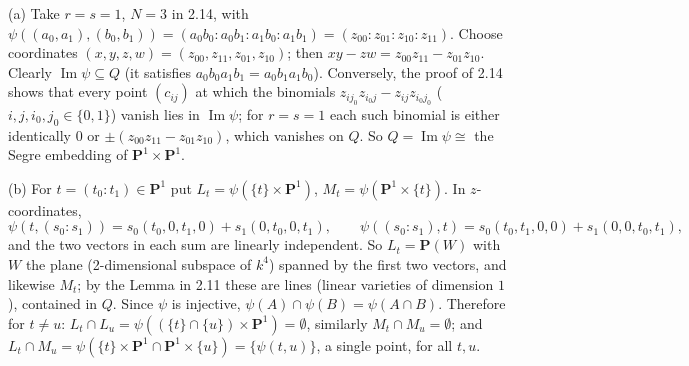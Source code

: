 \documentclass[11pt]{article}
\begin{document}
\pf
(a) Take $r=s=1$, $N=3$ in 2.14, with $\psi((a_0,a_1),(b_0,b_1))=(a_0b_0:a_0b_1:a_1b_0:a_1b_1)=(z_{00}:z_{01}:z_{10}:z_{11})$. Choose coordinates $(x,y,z,w)=(z_{00},z_{11},z_{01},z_{10})$; then $xy-zw=z_{00}z_{11}-z_{01}z_{10}$. Clearly $\operatorname{Im}\psi\subseteq Q$ (it satisfies $a_0b_0a_1b_1=a_0b_1a_1b_0$). Conversely, the proof of 2.14 shows that every point $(c_{ij})$ at which the binomials $z_{ij_0}z_{i_0j}-z_{ij}z_{i_0j_0}$ ($i,j,i_0,j_0\in\{0,1\}$) vanish lies in $\operatorname{Im}\psi$; for $r=s=1$ each such binomial is either identically $0$ or $\pm(z_{00}z_{11}-z_{01}z_{10})$, which vanishes on $Q$. So $Q=\operatorname{Im}\psi\cong$ the Segre embedding of $\mathbf P^1\times\mathbf P^1$.

(b) For $t=(t_0:t_1)\in\mathbf P^1$ put $L_t=\psi(\{t\}\times\mathbf P^1)$, $M_t=\psi(\mathbf P^1\times\{t\})$. In $z$-coordinates,
\[
\psi(t,(s_0:s_1))=s_0(t_0,0,t_1,0)+s_1(0,t_0,0,t_1),\qquad
\psi((s_0:s_1),t)=s_0(t_0,t_1,0,0)+s_1(0,0,t_0,t_1),
\]
and the two vectors in each sum are linearly independent. So $L_t=\mathbf P(W)$ with $W$ the plane (2-dimensional subspace of $k^4$) spanned by the first two vectors, and likewise $M_t$; by the Lemma in 2.11 these are lines (linear varieties of dimension $1$), contained in $Q$. Since $\psi$ is injective, $\psi(A)\cap\psi(B)=\psi(A\cap B)$. Therefore for $t\ne u$: $L_t\cap L_u=\psi((\{t\}\cap\{u\})\times\mathbf P^1)=\emptyset$, similarly $M_t\cap M_u=\emptyset$; and $L_t\cap M_u=\psi(\{t\}\times\mathbf P^1\cap\mathbf P^1\times\{u\})=\{\psi(t,u)\}$, a single point, for all $t,u$.
\end{document}
